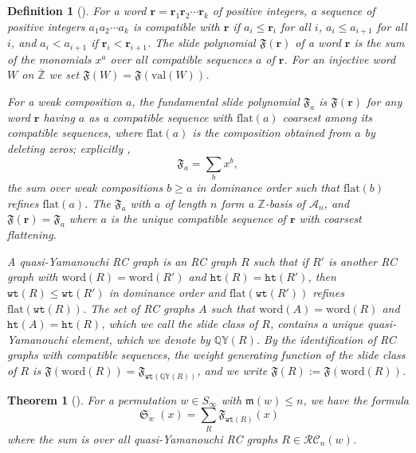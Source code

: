 \documentclass[pdflatex,sn-mathphys-num]{sn-jnl}
\numberwithin{equation}{subsection}
\DeclareMathOperator{\sch}{\mathfrak{S}}
\newcommand{\wtt}{\mathtt{wt}}
\newcommand{\QY}{\ensuremath{\mathbb{QY}}}
\newcommand{\hr}{\mathtt{ht}}
\newcommand{\RC}{\mathcal{RC}}
\newcommand{\coma}{\mathcal{A}}
\newcommand{\maxd}{\mathfrak{m}}
\theoremstyle{thmstyleone}
\newtheorem{theorem}{Theorem}[section]
\theoremstyle{thmstylethree}
\newtheorem{definition}[lemma]{Definition}
\theoremstyle{thmstyletwo}
\begin{document}
\begin{definition}[{\cite{assaf2017slide}}]\label{definition:slide}
For a word $\mathbf{r}=\mathbf{r}_1\mathbf{r}_2\cdots \mathbf{r}_k$ of positive integers, a sequence of positive integers $a_1a_2\cdots a_k$ is \emph{compatible} with $\mathbf{r}$ if $a_i\leq \mathbf{r}_i$ for all $i$, $a_i\leq a_{i+1}$ for all $i$, and $a_i<a_{i+1}$ if $\mathbf{r}_i<\mathbf{r}_{i+1}$. The \emph{slide polynomial} $\mathfrak{F}(\mathbf{r})$ of a word $\mathbf{r}$ is the sum of the monomials $x^a$ over all compatible sequences $a$ of $\mathbf{r}$. For an injective word $W$ on $\overline{\mathbb{Z}}$ we set $\mathfrak F(W)=\mathfrak F(\mathrm{val}(W))$.

For a weak composition $a$, the \emph{fundamental slide polynomial} $\mathfrak{F}_a$ is $\mathfrak{F}(\mathbf r)$ for any word $\mathbf r$ having $a$ as a compatible sequence with $\mathrm{flat}(a)$ coarsest among its compatible sequences, where $\mathrm{flat}(a)$ is the composition obtained from $a$ by deleting zeros; explicitly \cite{assaf2017slide},
$$\mathfrak{F}_a = \sum_{b} x^b,$$
the sum over weak compositions $b\geq a$ in dominance order such that $\mathrm{flat}(b)$ refines $\mathrm{flat}(a)$. The $\mathfrak F_a$ with $a$ of length $n$ form a $\mathbb{Z}$-basis of $\coma_n$, and $\mathfrak F(\mathbf r)=\mathfrak F_{a}$ where $a$ is the unique compatible sequence of $\mathbf r$ with coarsest flattening.

A \emph{quasi-Yamanouchi} RC graph is an RC graph $R$ such that if $R'$ is another RC graph with $\mathrm{word}(R)=\mathrm{word}(R')$ and $\hr(R)=\hr(R')$, then $\wtt(R)\leq \wtt(R')$ in dominance order and $\mathrm{flat}(\wtt(R'))$ refines $\mathrm{flat}(\wtt(R))$. The set of RC graphs $A$ such that $\mathrm{word}(A)=\mathrm{word}(R)$ and $\hr(A)=\hr(R)$, which we call the \emph{slide class} of $R$, contains a unique quasi-Yamanouchi element, which we denote by $\QY(R)$. By the identification of RC graphs with compatible sequences, the weight generating function of the slide class of $R$ is $\mathfrak F(\mathrm{word}(R)) = \mathfrak F_{\wtt(\QY(R))}$, and we write $\mathfrak F(R):=\mathfrak F(\mathrm{word}(R))$.
\end{definition}

\begin{theorem}[{\cite[Theorem~3.13]{assaf2017slide}}]\label{theorem:assafsearles}
  For a permutation $w\in S_\infty$ with $\maxd(w)\leq n$, we have the formula
  $$\sch_w(x) = \sum_{R} \mathfrak{F}_{\wtt(R)}(x)$$
  where the sum is over all quasi-Yamanouchi RC graphs $R\in\RC_n(w)$.
\end{theorem}
\end{document}

